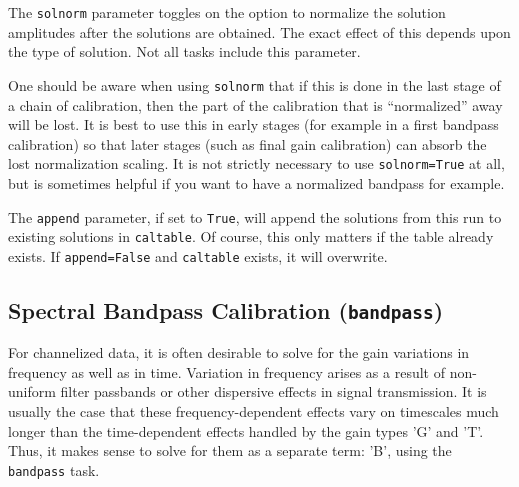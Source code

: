 The {\tt solnorm} parameter toggles on the option to normalize the
solution amplitudes after the solutions are obtained.  The exact
effect of this depends upon the type of solution.  Not all tasks
include this parameter.  

One should be aware when using {\tt solnorm} that if this is done
in the last stage of a chain of calibration, then the part of 
the calibration that is ``normalized'' away will be lost.  It is
best to use this in early stages (for example in a first bandpass
calibration) so that later stages (such as final gain calibration)
can absorb the lost normalization scaling.  It is not strictly
necessary to use {\tt solnorm=True} at all, but is sometimes helpful
if you want to have a normalized bandpass for example.

The {\tt append} parameter, if set to {\tt True}, will append the
solutions from this run to existing solutions in {\tt caltable}.
Of course, this only matters if the table already exists.  If
{\tt append=False} and {\tt caltable} exists, it will overwrite.

\subsection{Spectral Bandpass Calibration ({\tt bandpass})}
\label{section:cal.solve.band}

For channelized data, it is often desirable to solve for the gain
variations in frequency as well as in time.  Variation in frequency
arises as a result of non-uniform filter passbands or other dispersive
effects in signal transmission.  It is usually the case that these
frequency-dependent effects vary on timescales much longer than the
time-dependent effects handled by the gain types 'G' and 'T'.  
Thus, it makes sense to solve for them as a separate term: 'B', using the
{\tt bandpass} task.

